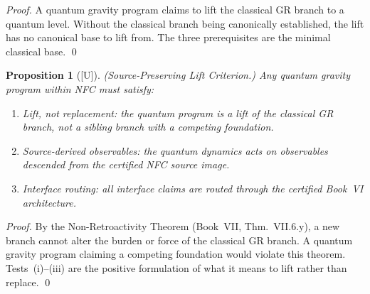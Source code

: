 \documentclass[12pt,oneside]{amsbook}
\theoremstyle{plain}
\newtheorem{proposition}[theorem]{Proposition}
\theoremstyle{definition}
\theoremstyle{remark}
\newcommand{\status}[1]{\textup{[#1]}}
\begin{document}
\begin{proof}
A quantum gravity program claims to lift the classical GR branch
to a quantum level. Without the classical branch being
canonically established, the lift has no canonical base to lift
from. The three prerequisites are the minimal classical base.
\qed
\end{proof}

\begin{proposition}[\status{U}]\label{prop:gr-lift-criterion}
\textup{(Source-Preserving Lift Criterion.)} Any quantum gravity
program within NFC must satisfy:
\begin{enumerate}[label=\textup{(\roman*)}]
 \item \emph{Lift, not replacement:} the quantum program is a
 lift of the classical GR branch, not a sibling branch
 with a competing foundation.
 \item \emph{Source-derived observables:} the quantum dynamics
 acts on observables descended from the certified NFC
 source image.
 \item \emph{Interface routing:} all interface claims are routed
 through the certified Book~VI architecture.
\end{enumerate}
\end{proposition}

\begin{proof}
By the Non-Retroactivity Theorem (Book~VII, Thm.~VII.6.y), a new
branch cannot alter the burden or force of the classical GR branch.
A quantum gravity program claiming a competing foundation would
violate this theorem. Tests~(i)--(iii) are the positive
formulation of what it means to lift rather than replace.
\qed
\end{proof}
\end{document}
